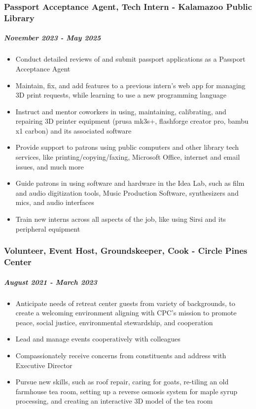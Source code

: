 \documentclass[11pt]{article}
\begin{document}
\subsubsection*{Passport Acceptance Agent, Tech Intern - Kalamazoo Public Library}
\label{sec:org59a5406}
\subparagraph*{\emph{November 2023 - May 2025}}
\label{sec:orgb58c53a}
\begin{itemize}
\item Conduct detailed reviews of and submit passport applications as a Passport Acceptance Agent
\item Maintain, fix, and add features to a previous intern's web app for managing 3D print requests, while learning to use a new programming language
\item Instruct and mentor coworkers in using, maintaining, calibrating, and repairing 3D printer equipment (prusa mk3s+, flashforge creator pro, bambu x1 carbon) and its associated software
\item Provide support to patrons using public computers and other library tech services, like printing/copying/faxing, Microsoft Office, internet and email issues, and much more
\item Guide patrons in using software and hardware in the Idea Lab, such as film and audio digitization tools, Music Production Software, synthesizers and mics, and audio interfaces
\item Train new interns across all aspects of the job, like using Sirsi and its peripheral equipment
\end{itemize}


\newpage
\subsubsection*{Volunteer, Event Host, Groundskeeper, Cook - Circle Pines Center}
\label{sec:orgfee3609}
\subparagraph*{\emph{August 2021 - March 2023}}
\label{sec:orgcf92460}
\begin{itemize}
\item Anticipate needs of retreat center guests from variety of backgrounds, to create a welcoming environment aligning with CPC’s mission to promote peace, social justice, environmental stewardship, and cooperation
\item Lead and manage events cooperatively with colleagues
\item Compassionately receive concerns from constituents and address with Executive Director
\item Pursue new skills, such as roof repair, caring for goats, re-tiling an old farmhouse tea room, setting up a reverse osmosis system for maple syrup processing, and creating an interactive 3D model of the tea room
\end{itemize}
\end{document}
